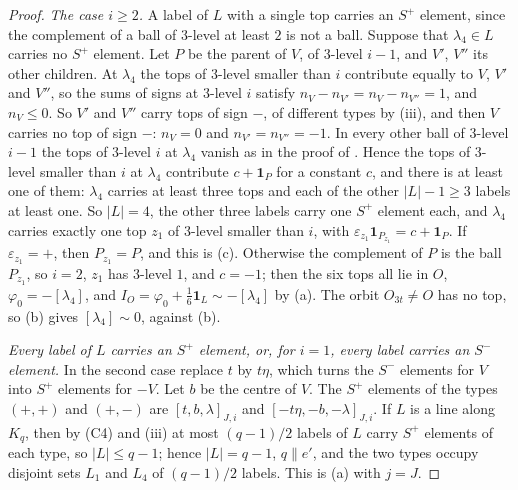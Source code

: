 \begin{proof}
\emph{The case $i\ge2$.} A label of $L$ with a single top carries an $S^{+}$
element, since the complement of a ball of $3$-level at least $2$ is not a
ball. Suppose that $\lambda_{4}\in L$ carries no $S^{+}$ element. Let $P$ be
the parent of $V$, of $3$-level $i-1$, and $V'$, $V''$ its other children.
At $\lambda_{4}$ the tops of $3$-level smaller than $i$ contribute equally to
$V$, $V'$ and $V''$, so the sums of signs at $3$-level $i$ satisfy
$n_{V}-n_{V'}=n_{V}-n_{V''}=1$, and $n_{V}\le0$. So $V'$ and $V''$ carry
tops of sign $-$, of different types by (iii), and
then $V$ carries no top of sign $-$: $n_{V}=0$ and $n_{V'}=n_{V''}=-1$. In
every other ball of $3$-level $i-1$ the tops of $3$-level $i$ at $\lambda_{4}$
vanish as in the proof of . Hence the tops of $3$-level
smaller than $i$ at $\lambda_{4}$ contribute $c+\mathbf 1_{P}$ for a constant
$c$, and there is at least one of them: $\lambda_{4}$ carries at least three
tops and each of the other $|L|-1\ge3$ labels at least one. So $|L|=4$, the
other three labels carry one $S^{+}$ element each, and $\lambda_{4}$ carries
exactly one top $z_{1}$ of $3$-level smaller than $i$, with
$\varepsilon_{z_{1}}\mathbf 1_{P_{z_{1}}}=c+\mathbf 1_{P}$. If
$\varepsilon_{z_{1}}=+$, then $P_{z_{1}}=P$, and this is
(c). Otherwise the complement of $P$ is the ball
$P_{z_{1}}$, so $i=2$, $z_{1}$ has $3$-level $1$, and $c=-1$; then the six
tops all lie in $O$, $\varphi_{0}=-[\lambda_{4}]$, and $I_{O}=\varphi_{0}+
\frac16\mathbf 1_{L}\sim-[\lambda_{4}]$ by (a). The orbit
$O_{3t}\ne O$ has no top, so (b) gives $[\lambda_{4}]\sim0$,
against (b).

\emph{Every label of $L$ carries an $S^{+}$ element, or, for $i=1$, every
label carries an $S^{-}$ element.} In the second case replace $t$ by
$t\eta$, which turns the $S^{-}$ elements for $V$ into $S^{+}$ elements for
$-V$. Let $b$ be the centre of $V$. The $S^{+}$ elements of the types $(+,+)$
and $(+,-)$ are $[t,b,\lambda]_{J,i}$ and $[-t\eta,-b,-\lambda]_{J,i}$. If $L$
is a line along $K_{q}$, then by (C4) and (iii) at most
$(q-1)/2$ labels of $L$ carry $S^{+}$ elements of each type, so
$|L|\le q-1$; hence $|L|=q-1$, $q\parallel e'$, and the two types occupy
disjoint sets $L_{1}$ and $L_{4}$ of $(q-1)/2$ labels. This is
(a) with $j=J$.


\end{proof}
